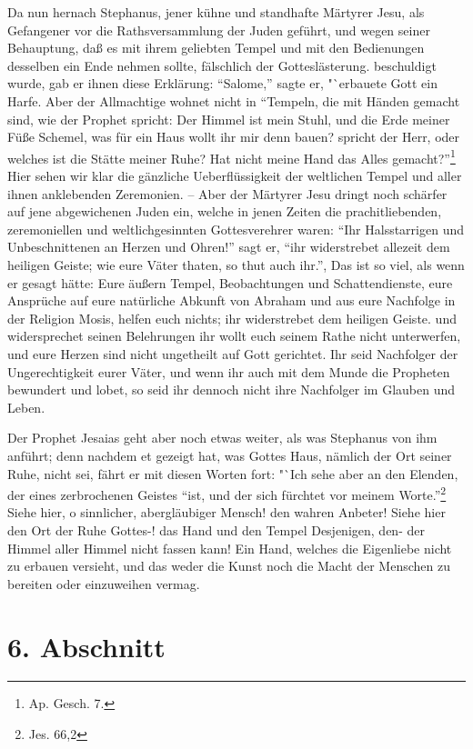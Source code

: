 Da nun hernach Stephanus, jener kühne und standhafte Märtyrer Jesu, als Gefangener vor die Rathsversammlung der Juden geführt, und wegen seiner Behauptung, daß es mit ihrem geliebten Tempel und mit den Bedienungen desselben ein Ende nehmen sollte, fälschlich der Gotteslästerung. beschuldigt wurde, gab er ihnen diese Erklärung: "`Salome,"' sagte er, "`erbauete Gott ein Harfe. Aber der Allmachtige wohnet nicht in "`Tempeln, die mit Händen gemacht sind, wie der Prophet spricht: Der Himmel ist mein Stuhl, und die Erde meiner Füße Schemel, was für ein Haus wollt ihr mir denn bauen? spricht der Herr, oder welches ist die Stätte meiner Ruhe? Hat nicht meine Hand das Alles gemacht?"'\footnote{Ap. Gesch. 7.} Hier sehen wir klar die gänzliche Ueberflüssigkeit der weltlichen Tempel und aller ihnen anklebenden Zeremonien. -- Aber der Märtyrer Jesu dringt noch schärfer auf jene abgewichenen Juden ein, welche in jenen Zeiten die prachitliebenden, zeremoniellen und weltlichgesinnten Gottesverehrer waren: "`Ihr Halsstarrigen und Unbeschnittenen an Herzen und Ohren!"' sagt er, "`ihr widerstrebet allezeit dem heiligen Geiste; wie eure Väter thaten, so thut auch ihr."', Das ist so viel, als wenn er gesagt hätte: Eure äußern Tempel, Beobachtungen und Schattendienste, eure Ansprüche auf eure natürliche Abkunft von Abraham  und aus eure Nachfolge in der Religion Mosis, helfen euch nichts; ihr widerstrebet dem heiligen Geiste. und widersprechet seinen Belehrungen ihr wollt euch seinem Rathe nicht unterwerfen, und eure Herzen sind nicht ungetheilt auf Gott gerichtet. Ihr seid Nachfolger der Ungerechtigkeit eurer Väter, und wenn ihr auch mit dem Munde die Propheten bewundert und lobet, so seid ihr dennoch nicht ihre Nachfolger im Glauben und Leben.

Der Prophet Jesaias geht aber noch etwas weiter, als was Stephanus von ihm anführt; denn nachdem et gezeigt hat, was Gottes Haus, nämlich der Ort seiner Ruhe, nicht sei, fährt er mit diesen Worten fort: "`Ich sehe aber an den Elenden, der eines zerbrochenen Geistes "`ist, und der sich fürchtet vor meinem Worte."'\footnote{Jes. 66,2} Siehe hier, o sinnlicher, abergläubiger Mensch! den wahren Anbeter! Siehe hier den Ort der Ruhe Gottes-! das Hand und den Tempel Desjenigen, den- der Himmel aller Himmel nicht fassen kann! Ein Hand, welches die Eigenliebe nicht zu erbauen versieht, und das weder die Kunst noch die Macht der Menschen zu bereiten oder einzuweihen vermag.

\section{6. Abschnitt}

